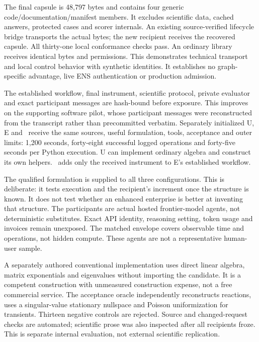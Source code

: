 The final capsule is 48,797 bytes and contains four generic code/documentation/manifest members. It excludes scientific data, cached answers, protected cases and scorer internals. An existing source-verified lifecycle bridge transports the actual bytes; the new recipient receives the recovered capsule. All thirty-one local conformance checks pass. An ordinary library receives identical bytes and permissions. This demonstrates technical transport and local control behavior with synthetic identities. It establishes no graph-specific advantage, live ENS authentication or production admission.



The established workflow, final instrument, scientific protocol, private evaluator and exact participant messages are hash-bound before exposure. This improves on the supporting software pilot, whose participant messages were reconstructed from the transcript rather than precommitted verbatim. Separately initialized U, E and \Eplus\ receive the same sources, useful formulation, tools, acceptance and outer limits: 1,200 seconds, forty-eight successful logged operations and forty-five seconds per Python execution. U can implement ordinary algebra and construct its own helpers. \Eplus\ adds only the received instrument to E's established workflow.

The qualified formulation is supplied to all three configurations. This is deliberate: it tests execution and the recipient's increment once the structure is known. It does not test whether an enhanced enterprise is better at inventing that structure. The participants are actual hosted frontier-model agents, not deterministic substitutes. Exact API identity, reasoning setting, token usage and invoices remain unexposed. The matched envelope covers observable time and operations, not hidden compute. These agents are not a representative human-user sample.

A separately authored conventional implementation uses direct linear algebra, matrix exponentials and eigenvalues without importing the candidate. It is a competent construction with unmeasured construction expense, not a free commercial service. The acceptance oracle independently reconstructs reactions, uses a singular-value stationary nullspace and Poisson uniformization for transients. Thirteen negative controls are rejected. Source and changed-request checks are automated; scientific prose was also inspected after all recipients froze. This is separate internal evaluation, not external scientific replication.

